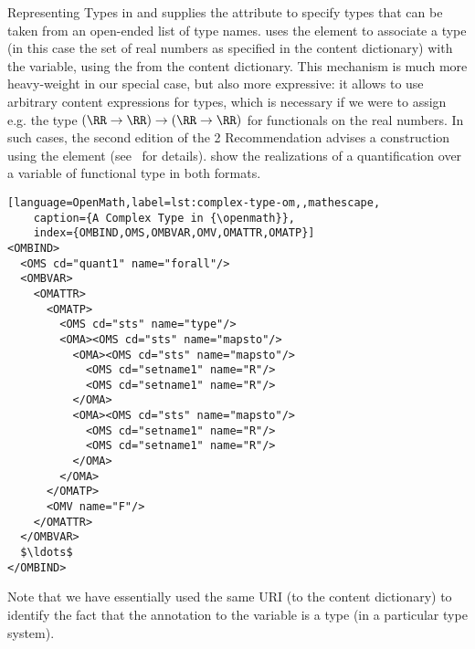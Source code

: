 \begin{omgroup}[id=mobj,short=Mathematical Objects]
\begin{module}[id=omml-types]
\begin{omgroup}[id=mobj.types]{Representing Types in {\cmathml} and {\openmath}}
{\mathml} supplies the {} attribute
to specify types that can be taken from an open-ended list of type names.  {\openmath}
uses the  element to associate a type (in this case the set
of real numbers as specified in the {} content dictionary) with the
variable, using the {} {} from the
{} content dictionary. This mechanism is much more heavy-weight in our
special case, but also more expressive: it allows to use arbitrary content expressions for
types, which is necessary if we were to assign e.g. the type $(\RR\to\RR)\to(\RR\to\RR)$
for functionals on the real numbers. In such cases, the second edition of the {\mathml}2
Recommendation advises a construction using the  element
(see~\cite{DevKoh:stm03} for details).  {}
show the realizations of a quantification over a variable of functional type in both
formats.

\begin{lstlisting}[language=OpenMath,label=lst:complex-type-om,,mathescape,
    caption={A Complex Type in {\openmath}},
    index={OMBIND,OMS,OMBVAR,OMV,OMATTR,OMATP}]
<OMBIND>                          
  <OMS cd="quant1" name="forall"/> 
  <OMBVAR>                         
    <OMATTR>                        
      <OMATP>                        
        <OMS cd="sts" name="type"/>
        <OMA><OMS cd="sts" name="mapsto"/>   
          <OMA><OMS cd="sts" name="mapsto"/>   
            <OMS cd="setname1" name="R"/>  
            <OMS cd="setname1" name="R"/>
          </OMA>
          <OMA><OMS cd="sts" name="mapsto"/>   
            <OMS cd="setname1" name="R"/>  
            <OMS cd="setname1" name="R"/>
          </OMA>
        </OMA>  
      </OMATP>                       
      <OMV name="F"/>                
    </OMATTR>                        
  </OMBVAR>                        
  $\ldots$
</OMBIND>                         
\end{lstlisting}

Note that we have essentially used the same URI (to the {} content
dictionary) to identify the fact that the annotation to the variable is a type (in
a particular type system).


\end{omgroup}
\end{module}
\end{omgroup}
